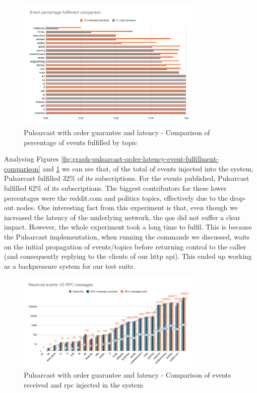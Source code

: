 \begin{figure}[!htb]
  \centering
  \includegraphics[width=0.8\textwidth]{img/graph-pulsarcast-order-latency-event-percentage-fulfillment-comparison.png}
  \caption{Pulsarcast with order guarantee and latency - Comparison of percentage of events fulfilled by topic}
  \label{fig:graph-pulsarcast-order-latency-event-percentage-fulfillment-comparison}
\end{figure}

Analysing Figures
\ref{fig:graph-pulsarcast-order-latency-event-fulfillment-comparison} and
\ref{fig:graph-pulsarcast-order-latency-event-percentage-fulfillment-comparison}
we can see that, of the total of events injected into the system, Pulsarcast
fulfilled 32\% of its subscriptions. For the events published, Pulsarcast
fulfilled 62\% of its subscriptions. The biggest contributors for these lower
percentages were the reddit.com and politics topics, effectively due to the
drop-out nodes. One interesting fact from this experiment is that, even though
we increased the latency of the underlying network, the \acrshort{qos} did not
suffer a clear impact.  However, the whole experiment took a long time to
fulfil. This is because the Pulsarcast implementation, when running the
commands we discussed, waits on the initial propagation of events/topics before
returning control to the caller (and consequently replying to the clients of
our \acrshort{http} \acrshort{api}). This ended up working as a backpressure
system for our test suite.

\begin{figure}[!htb]
  \centering
  \includegraphics[width=0.8\textwidth]{img/graph-pulsarcast-order-latency-rpc.png}
  \caption{Pulsarcast with order guarantee and latency - Comparison of events received and \acrshort{rpc} injected in the system}
  \label{fig:graph-pulsarcast-order-latency-rpc}
\end{figure}



